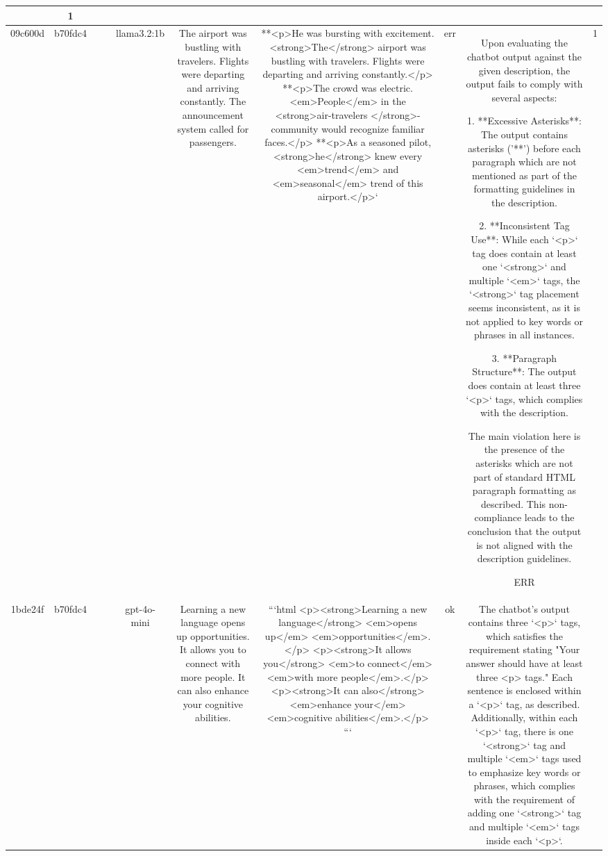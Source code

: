 \begin{table}[h!]
\begin{tabular}{|c|c|c|c|c|c|c|c|c|c|}
{{No violation.
OK & 1\\
\hline
09c600d & b70fdc4 &  &  & llama3.2:1b & The airport was bustling with travelers. Flights were departing and arriving constantly. The announcement system called for passengers. & **<p>He was bursting with excitement. <strong>The</strong> airport was bustling with travelers. Flights were departing and arriving constantly.</p>
**<p>The crowd was electric. <em>People</em> in the <strong>air-travelers </strong>- community would recognize familiar faces.</p>
**<p>As a seasoned pilot, <strong>he</strong> knew every <em>trend</em> and <em>seasonal</em> trend of this airport.</p>` & err & Upon evaluating the chatbot output against the given description, the output fails to comply with several aspects:

1. **Excessive Asterisks**: The output contains asterisks ('**') before each paragraph which are not mentioned as part of the formatting guidelines in the description.

2. **Inconsistent Tag Use**: While each `<p>` tag does contain at least one `<strong>` and multiple `<em>` tags, the `<strong>` tag placement seems inconsistent, as it is not applied to key words or phrases in all instances.

3. **Paragraph Structure**: The output does contain at least three `<p>` tags, which complies with the description.

The main violation here is the presence of the asterisks which are not part of standard HTML paragraph formatting as described. This non-compliance leads to the conclusion that the output is not aligned with the description guidelines.

ERR & 1\\
\hline
1bde24f & b70fdc4 &  &  & gpt-4o-mini & Learning a new language opens up opportunities. It allows you to connect with more people. It can also enhance your cognitive abilities. & ```html
<p><strong>Learning a new language</strong> <em>opens up</em> <em>opportunities</em>.</p>
<p><strong>It allows you</strong> <em>to connect</em> <em>with more people</em>.</p>
<p><strong>It can also</strong> <em>enhance your</em> <em>cognitive abilities</em>.</p>
``` & ok & The chatbot's output contains three `<p>` tags, which satisfies the requirement stating "Your answer should have at least three <p> tags." Each sentence is enclosed within a `<p>` tag, as described. Additionally, within each `<p>` tag, there is one `<strong>` tag and multiple `<em>` tags used to emphasize key words or phrases, which complies with the requirement of adding one `<strong>` tag and multiple `<em>` tags inside each `<p>`.

}}
\end{tabular}
\end{table}
